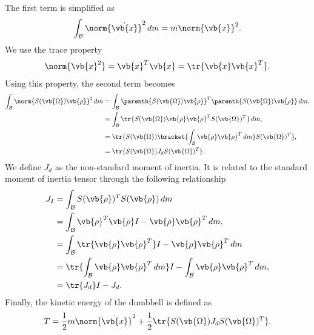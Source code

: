 \documentclass[11pt, reqno]{article}    %
\begin{document}
The first term is simplified as
\begin{align*}
    \int_{\mathcal{B}} \norm{\dot{\vb{x}}}^2 \, dm = m \norm{\vb{x}}^2 .
\end{align*}
We use the trace property
\begin{align*}
    \norm{\vb{x}^2} = \vb{x}^T \vb{x} = \tr{\vb{x} \vb{x}^T} .
\end{align*}
Using this property, the second term becomes
\begin{align*}
    \int_{\mathcal{B}} \norm{S(\vb{\Omega}) \vb{\rho}}^2 \, dm &= \int_{\mathcal{B}} \parenth{S(\vb{\Omega}) \vb{\rho}}^T \parenth{S(\vb{\Omega}) \vb{\rho}}\, dm , \\
    &= \int_{\mathcal{B}} \tr{S(\vb{\Omega}) \vb{\rho} \vb{\rho}^T S(\vb{\Omega})^T}\, dm , \\
    &= \tr{S(\vb{\Omega}) \bracket{\int_{\mathcal{B}} \vb{\rho} \vb{\rho}^T \, dm} S(\vb{\Omega})^T} , \\
    &= \tr{S(\vb{\Omega}) J_d S(\vb{\Omega})^T} .
\end{align*}
We define \( J_d \) as the non-standard moment of inertia.
It is related to the standard moment of inertia tensor through the following relationship
\begin{align*}
    J_I &= \int_{\mathcal{B}} S(\vb{\rho})^T S(\vb{\rho}) \, dm \\
    &= \int_{\mathcal{B}} \vb{\rho}^T \vb{\rho} I - \vb{\rho}\vb{\rho}^T \, dm , \\
    &= \int_{\mathcal{B}} \tr{\vb{\rho} \vb{\rho}^T} I - \vb{\rho}\vb{\rho}^T \, dm \\
    &= \tr{\int_{\mathcal{B}} \vb{\rho} \vb{\rho}^T \, dm} I - \int_{\mathcal{B}} \vb{\rho} \vb{\rho}^T \, dm , \\
    &= \tr{J_d} I - J_d .
\end{align*}
Finally, the kinetic energy of the dumbbell is defined as
\begin{align}\label{eq:kinetic_energy}
    T = \frac{1}{2} m \norm{\dot{\vb{x}}}^2 + \frac{1}{2} \tr{S(\vb{\Omega}) J_d S(\vb{\Omega})^T} .
\end{align}
\end{document}
